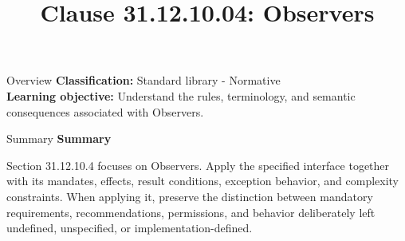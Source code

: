 \documentclass[10pt,letterpaper]{article}
\title{Clause 31.12.10.04: Observers}
\author{}
\date{}
\begin{document}
\maketitle
\begin{CornellOverviewBox}{Overview}
\textbf{Classification:} Standard library - Normative\\[2pt]
\textbf{Learning objective:} Understand the rules, terminology, and semantic consequences associated with Observers.
\end{CornellOverviewBox}\begin{CornellSummaryBox}{Summary}
{\sffamily\bfseries\color{Accent} Summary}\par\vspace{3pt}Section 31.12.10.4 focuses on Observers. Apply the specified interface together with its mandates, effects, result conditions, exception behavior, and complexity constraints. When applying it, preserve the distinction between mandatory requirements, recommendations, permissions, and behavior deliberately left undefined, unspecified, or implementation-defined.
\end{CornellSummaryBox}
\end{document}
